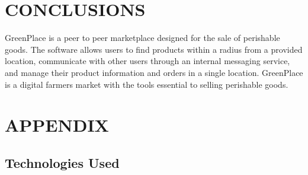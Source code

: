 \documentclass[letterpaper, 10 pt, conference]{ieeeconf}  %
\begin{document}
\section{CONCLUSIONS}
GreenPlace is a peer to peer marketplace designed for the sale of perishable goods. The software allows users to find products within a radius from a provided location, communicate with other users through an internal messaging service, and manage their product information and orders in a single location. GreenPlace is a digital farmers market with the tools essential to selling perishable goods.


\clearpage
\onecolumn
\section{APPENDIX}

\subsection{Technologies Used}
\end{document}

